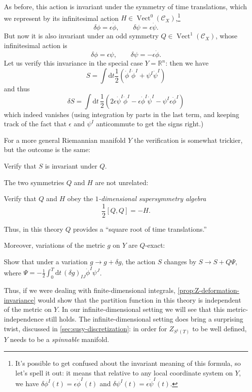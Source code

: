 \documentclass[12pt,letterpaper,reqno]{article}
\numberwithin{equation}{section}
\newcommand{\cC}{\ensuremath{\mathcal C}}
\newcommand{\R}{\ensuremath{\mathbb R}}
\newcommand{\half}{\ensuremath{\frac{1}{2}}}
\newcommand{\de}{\mathrm{d}}
\newcommand{\eps}{\epsilon}
\newcommand{\ti}[1]{\textit{#1}}
\DeclareMathOperator{\Vect}{Vect}
\newcommand{\fixme}[1]{{\color{orange}{[#1]}}}
\begin{document}
As before, this action is invariant under the symmetry of time translations,
which we represent by its infinitesimal action $H \in \Vect^0(\cC_X)$,\footnote{It's possible to 
get confused about the invariant meaning of this formula, so let's spell it out:
it means that relative to any local coordinate system on $Y$, we have
$\delta \phi^I(t) = \eps \dot\phi^I(t)$ and $\delta \psi^I(t) = \eps \dot \psi^I(t)$.}
\begin{equation}
  \delta \phi = \eps \dot\phi, \qquad \delta \psi = \eps \dot\psi.
\end{equation}
But now it is also invariant under an odd symmetry $Q \in \Vect^1(\cC_X)$,
whose infinitesimal action is
\begin{equation}
  \delta \phi = \eps \psi, \qquad \delta \psi = - \eps \dot\phi.
\end{equation}
Let us verify this invariance in the special case $Y = \R^n$:
then we have
\begin{equation}
  S = \int \de t \half (\dot\phi^I \dot\phi^I + \psi^I \dot \psi^I)
\end{equation}
and thus
\begin{equation}
  \delta S = \int \de t \, \half (2 \eps \dot\psi^I \dot\phi^I - \eps \dot\phi^I \dot\psi^I - \psi^I \eps \ddot \phi^I)
\end{equation}
which indeed vanishes (using integration by parts in the last term,
and keeping track of the fact that $\eps$ and $\psi^I$ anticommute
to get the signs right.)

For a more general Riemannian manifold $Y$ the verification is
somewhat trickier, but the outcome is the same:
\begin{exercise}
Verify that $S$ is invariant under $Q$.
\end{exercise}

The two symmetries $Q$ and $H$ are not unrelated:
\begin{exercise}
Verify that $Q$ and $H$ obey the \ti{$1$-dimensional supersymmetry algebra}
\begin{equation}
  \half [Q,Q] = -H.
\end{equation}
\end{exercise}
Thus, in this theory $Q$ provides a ``square root of time translations.''

Moreover, variations of the metric $g$ on $Y$ are $Q$-exact:
\begin{exercise}
Show that under a variation $g \to g + \delta g$,
the action $S$ changes by $S \to S + Q \Psi$, where 
$\Psi = -\half \int_0^T \de t \, (\delta g)_{IJ} \dot \phi^I \psi^J$. \fixme{check}
\end{exercise}
Thus, if we were dealing with finite-dimensional integrals, 
\autoref{prop:Z-deformation-invariance} would show 
that the partition function in this theory
is independent of the metric on $Y$. In our infinite-dimensional
setting we will see that this metric-independence still holds.
The infinite-dimensional setting does bring a surprising twist,
discussed in \autoref{sec:susy-discretization}:
in order for $Z_{S^1(T)}$ to be well defined, $Y$ needs to be 
a \ti{spinnable} manifold.
\end{document}
